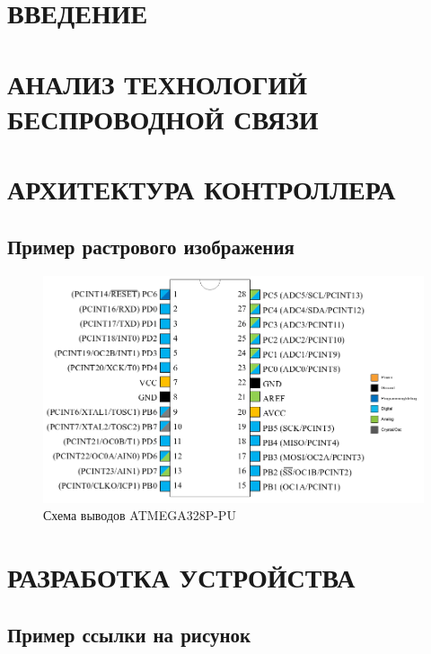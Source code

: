 \documentclass[a4paper,14pt]{extarticle}
\begin{document}
\tableofcontents
\newpage

\section*{ВВЕДЕНИЕ}
\newpage

\section{АНАЛИЗ ТЕХНОЛОГИЙ БЕСПРОВОДНОЙ СВЯЗИ}

\newpage

\section{АРХИТЕКТУРА КОНТРОЛЛЕРА}

\subsection{Пример растрового изображения}

\begin{figure}[H]
 \centering
 \includegraphics[width=150mm,scale=0.5]{examples/avrpinout}
 \caption{Схема выводов ATMEGA328P-PU}
 \label{avrpinout}
\end{figure}

\newpage

\section{РАЗРАБОТКА УСТРОЙСТВА}

\subsection{Пример ссылки на рисунок}
\end{document}
